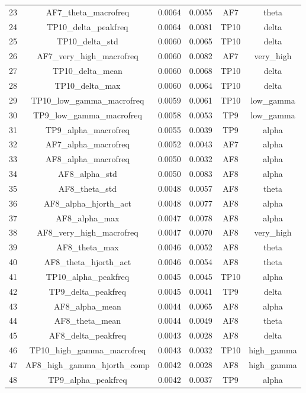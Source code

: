 \begin{table}[hptb]
\begin{table}
\begin{tabular}{cccccc}
23 & AF7_theta_macrofreq & 0.0064 & 0.0055 & AF7 & theta \\
24 & TP10_delta_peakfreq & 0.0064 & 0.0081 & TP10 & delta \\
25 & TP10_delta_std & 0.0060 & 0.0065 & TP10 & delta \\
26 & AF7_very_high_macrofreq & 0.0060 & 0.0082 & AF7 & very_high \\
27 & TP10_delta_mean & 0.0060 & 0.0068 & TP10 & delta \\
28 & TP10_delta_max & 0.0060 & 0.0064 & TP10 & delta \\
29 & TP10_low_gamma_macrofreq & 0.0059 & 0.0061 & TP10 & low_gamma \\
30 & TP9_low_gamma_macrofreq & 0.0058 & 0.0053 & TP9 & low_gamma \\
31 & TP9_alpha_macrofreq & 0.0055 & 0.0039 & TP9 & alpha \\
32 & AF7_alpha_macrofreq & 0.0052 & 0.0043 & AF7 & alpha \\
33 & AF8_alpha_macrofreq & 0.0050 & 0.0032 & AF8 & alpha \\
34 & AF8_alpha_std & 0.0050 & 0.0083 & AF8 & alpha \\
35 & AF8_theta_std & 0.0048 & 0.0057 & AF8 & theta \\
36 & AF8_alpha_hjorth_act & 0.0048 & 0.0077 & AF8 & alpha \\
37 & AF8_alpha_max & 0.0047 & 0.0078 & AF8 & alpha \\
38 & AF8_very_high_macrofreq & 0.0047 & 0.0070 & AF8 & very_high \\
39 & AF8_theta_max & 0.0046 & 0.0052 & AF8 & theta \\
40 & AF8_theta_hjorth_act & 0.0046 & 0.0054 & AF8 & theta \\
41 & TP10_alpha_peakfreq & 0.0045 & 0.0045 & TP10 & alpha \\
42 & TP9_delta_peakfreq & 0.0045 & 0.0041 & TP9 & delta \\
43 & AF8_alpha_mean & 0.0044 & 0.0065 & AF8 & alpha \\
44 & AF8_theta_mean & 0.0044 & 0.0049 & AF8 & theta \\
45 & AF8_delta_peakfreq & 0.0043 & 0.0028 & AF8 & delta \\
46 & TP10_high_gamma_macrofreq & 0.0043 & 0.0032 & TP10 & high_gamma \\
47 & AF8_high_gamma_hjorth_comp & 0.0042 & 0.0028 & AF8 & high_gamma \\
48 & TP9_alpha_peakfreq & 0.0042 & 0.0037 & TP9 & alpha \\

\end{tabular}
\end{table}
\end{table}
